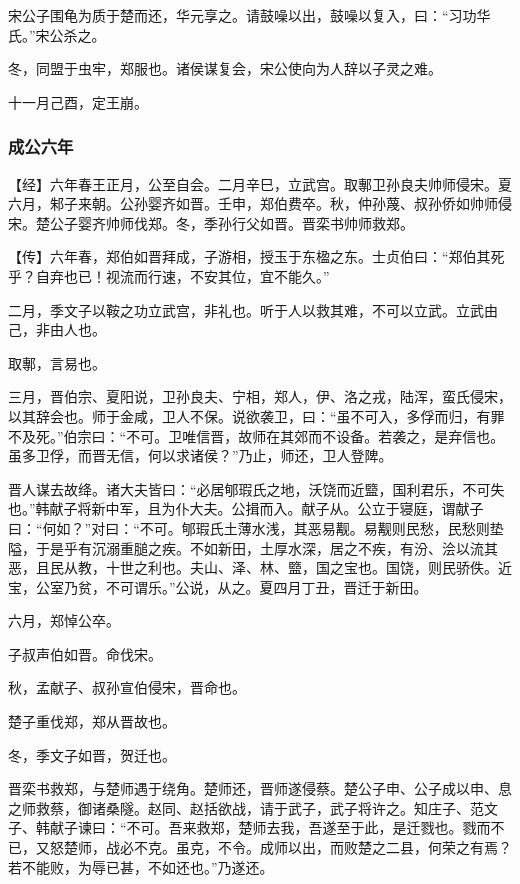 \documentclass[]{article}
\begin{document}
宋公子围龟为质于楚而还，华元享之。请鼓噪以出，鼓噪以复入，曰：``习功华氏。''宋公杀之。

冬，同盟于虫牢，郑服也。诸侯谋复会，宋公使向为人辞以子灵之难。

十一月己酉，定王崩。

\hypertarget{header-n1596}{%
\subsubsection{成公六年}\label{header-n1596}}

【经】六年春王正月，公至自会。二月辛巳，立武宫。取鄟卫孙良夫帅师侵宋。夏六月，邾子来朝。公孙婴齐如晋。壬申，郑伯费卒。秋，仲孙蔑、叔孙侨如帅师侵宋。楚公子婴齐帅师伐郑。冬，季孙行父如晋。晋栾书帅师救郑。

【传】六年春，郑伯如晋拜成，子游相，授玉于东楹之东。士贞伯曰：``郑伯其死乎？自弃也已！视流而行速，不安其位，宜不能久。''

二月，季文子以鞍之功立武宫，非礼也。听于人以救其难，不可以立武。立武由己，非由人也。

取鄟，言易也。

三月，晋伯宗、夏阳说，卫孙良夫、宁相，郑人，伊、洛之戎，陆浑，蛮氏侵宋，以其辞会也。师于金咸，卫人不保。说欲袭卫，曰：``虽不可入，多俘而归，有罪不及死。''伯宗曰：``不可。卫唯信晋，故师在其郊而不设备。若袭之，是弃信也。虽多卫俘，而晋无信，何以求诸侯？''乃止，师还，卫人登陴。

晋人谋去故绛。诸大夫皆曰：``必居郇瑕氏之地，沃饶而近盬，国利君乐，不可失也。''韩献子将新中军，且为仆大夫。公揖而入。献子从。公立于寝庭，谓献子曰：``何如？''对曰：``不可。郇瑕氏土薄水浅，其恶易觏。易觏则民愁，民愁则垫隘，于是乎有沉溺重膇之疾。不如新田，土厚水深，居之不疾，有汾、浍以流其恶，且民从教，十世之利也。夫山、泽、林、盬，国之宝也。国饶，则民骄佚。近宝，公室乃贫，不可谓乐。''公说，从之。夏四月丁丑，晋迁于新田。

六月，郑悼公卒。

子叔声伯如晋。命伐宋。

秋，孟献子、叔孙宣伯侵宋，晋命也。

楚子重伐郑，郑从晋故也。

冬，季文子如晋，贺迁也。

晋栾书救郑，与楚师遇于绕角。楚师还，晋师遂侵蔡。楚公子申、公子成以申、息之师救蔡，御诸桑隧。赵同、赵括欲战，请于武子，武子将许之。知庄子、范文子、韩献子谏曰：``不可。吾来救郑，楚师去我，吾遂至于此，是迁戮也。戮而不已，又怒楚师，战必不克。虽克，不令。成师以出，而败楚之二县，何荣之有焉？若不能败，为辱已甚，不如还也。''乃遂还。
\end{document}
